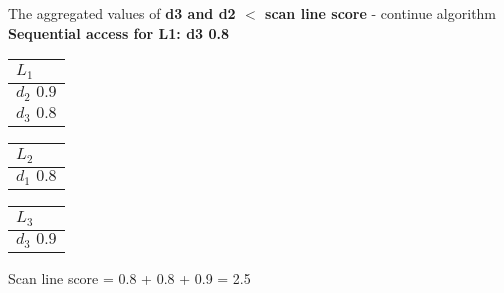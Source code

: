 The aggregated values of\textbf{ d3 and d2 $<$ scan line score} - continue algorithm
\\
\textbf{Sequential access for L1: d3 0.8}
\\
\begin{center}
    \begin{minipage}[t]{2cm}
        \begin{tabular}{|p{25pt}|}\hline
          $L_1$\\\hline
          $d_2 \, \, 0.9$\\\hline
          $d_3 \, \, 0.8$\\\hline
        \end{tabular}
    \end{minipage}
    \hspace{5mm}
    \begin{minipage}[t]{2cm}
        \begin{tabular}{|p{25pt}|}\hline
          $L_2$\\\hline
          $d_1 \, \, 0.8$\\\hline
            \end{tabular}
    \end{minipage}
    \hspace{5mm}
    \begin{minipage}[t]{2cm}
        \begin{tabular}{|p{25pt}|}\hline
        $L_3$\\\hline
        $d_3 \, \, 0.9$\\\hline      
        \end{tabular}
    \end{minipage}
    \end{center}

 Scan line score = 0.8 + 0.8 + 0.9 = 2.5

